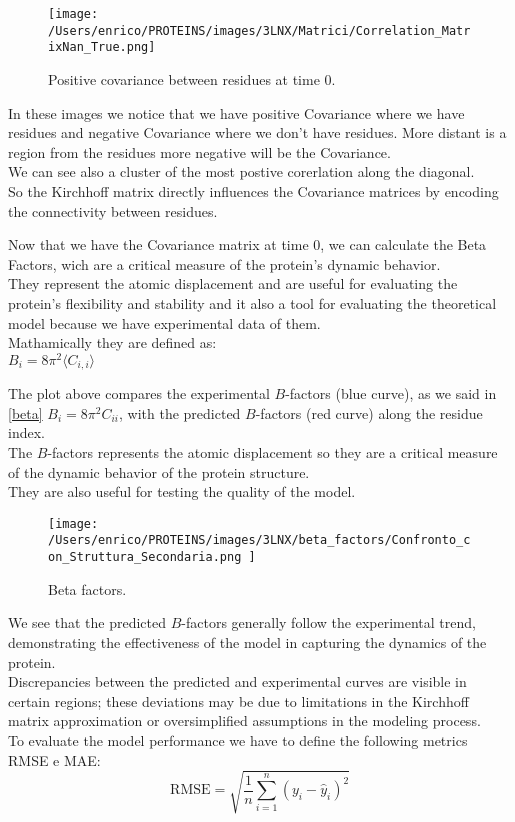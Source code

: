 \documentclass[English, Lau, oneside]{sapthesis}
\begin{document}
\begin{figure}[h!]
    \centering
    \texttt{[image: /Users/enrico/PROTEINS/images/3LNX/Matrici/Correlation\_MatrixNan\_True.png]}
    \caption{Positive covariance between residues at time 0.}
    \label{fig:Covariance_positive_figo}
\end{figure}
In these images we notice that we have positive Covariance where we have residues and negative Covariance where we don't have residues.
More distant is a region from the residues more negative will be the Covariance.\\
We can see also a cluster of the most postive corerlation along the diagonal.\\
So the Kirchhoff matrix directly influences the Covariance matrices by encoding the connectivity between residues. 


Now that we have the Covariance matrix at time 0, we can calculate the Beta Factors, wich are a critical measure of the protein's dynamic behavior.\\
They represent the atomic displacement and are useful for evaluating the protein's flexibility and stability and it also a tool for evaluating the theoretical model because we have experimental data of them.\\
Mathamically they are defined as:\\
$B_i = 8\pi^2 \langle C_{i,i} \rangle$ 

The plot above compares the experimental \( B \)-factors (blue curve), as we said in \eqref{beta} $B_i = 8\pi^2 C_{ii}$, with the predicted \( B \)-factors (red curve) along the residue index. \\
The \( B \)-factors represents the atomic displacement so they are a critical measure of the dynamic behavior of the protein structure. \\
They are also useful for testing the quality of the model.\\
\begin{figure}[h!]
    \centering
    \texttt{[image: /Users/enrico/PROTEINS/images/3LNX/beta\_factors/Confronto\_con\_Struttura\_Secondaria.png
    ]}
    \caption{Beta factors.}
\end{figure}
We see that the predicted \( B \)-factors generally follow the experimental trend, demonstrating the effectiveness of the model in capturing the dynamics of the protein.\\
Discrepancies between the predicted and experimental curves are visible in certain regions; these deviations may be due to limitations in the Kirchhoff matrix approximation or oversimplified assumptions in the modeling process.\\
To evaluate the model performance we have to define the following metrics RMSE e MAE:
\[
\text{RMSE} = \sqrt{\frac{1}{n} \sum_{i=1}^n (y_i - \hat{y}_i)^2}
\]
\end{document}
